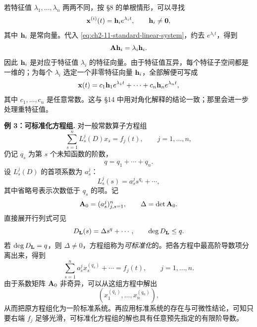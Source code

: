 若特征值 \(\lambda_1,\ldots,\lambda_n\) 两两不同，按 §8 的单根情形，可以寻找
\begin{equation}
 \vect{x}^{(i)}(t)=\vect{h}_i e^{\lambda_it},
 \qquad \vect{h}_i\ne\vect{0},
 \label{eq:ch2-11-eigenmode-ansatz}
\end{equation}
其中 \(\vect{h}_i\) 是常向量。代入 \eqref{eq:ch2-11-standard-linear-system}，约去 \(e^{\lambda_it}\)，得到
\begin{equation}
 \mat{A}\vect{h}_i=\lambda_i\vect{h}_i.
 \label{eq:ch2-11-eigenvector-equation}
\end{equation}
因此 \(\vect{h}_i\) 是对应于特征值 \(\lambda_i\) 的特征向量。由于特征值互异，每个特征子空间都是一维的；为每个 \(\lambda_i\) 选定一个非零特征向量 \(\vect{h}_i\)，全部解便可写成
\begin{equation}
 \vect{x}(t)=c_1\vect{h}_1e^{\lambda_1t}+\cdots+c_n\vect{h}_ne^{\lambda_nt},
 \label{eq:ch2-11-simple-spectrum-solution}
\end{equation}
其中 \(c_1,\ldots,c_n\) 是任意常数。这与 §14 中用对角化解释的结论一致；那里会进一步处理重特征值。

\noindent\textbf{例 3：可标准化方程组.}
对一般常数算子方程组
\begin{equation}
 \sum_{s=1}^nL_s^j(D)x_s=f_j(t),
 \qquad j=1,\ldots,n,
 \label{eq:ch2-11-general-again}
\end{equation}
仍记 \(q_s\) 为第 \(s\) 个未知函数的阶数，
\[
 q=q_1+\cdots+q_n.
\]
设 \(L_s^j(D)\) 的首项系数为 \(a_s^j\)：
\begin{equation}
 L_s^j(s)=a_s^js^{q_s}+\cdots,
 \label{eq:ch2-11-leading-polynomials}
\end{equation}
其中省略号表示次数低于 \(q_s\) 的项。记
\[
 \mathbf{A}_0=(a_s^j)_{j,s=1}^n,
 \qquad
 \Delta=\det \mathbf{A}_0.
\]
直接展开行列式可见
\begin{equation}
 D_{\mathbf{L}}(s)=\Delta s^q+\cdots,
 \qquad
 \deg D_{\mathbf{L}}\le q.
 \label{eq:ch2-11-determinant-leading-degree}
\end{equation}
若 \(\deg D_{\mathbf{L}}=q\)，则 \(\Delta\ne0\)，方程组称为\emph{可标准化}的。把各方程中最高阶导数项分离出来，得到
\begin{equation}
 \sum_{s=1}^na_s^jx_s^{(q_s)}+\cdots=f_j(t),
 \qquad j=1,\ldots,n.
 \label{eq:ch2-11-leading-system}
\end{equation}
由于系数矩阵 \(\mathbf{A}_0\) 非奇异，可以从这组方程中解出
\[
 (x_1^{(q_1)},\ldots,x_n^{(q_n)}),
\]
从而把原方程组化为一阶标准系统。再应用标准系统的存在与可微性结论，可知只要右端 \(f_j\) 足够光滑，可标准化方程组的解也具有任意预先指定的有限阶导数。

